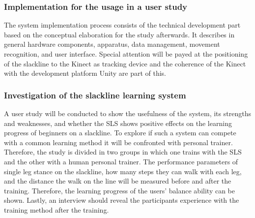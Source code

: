 \subsubsection{Implementation for the usage in a user study}
The system implementation process consists of the technical development part based on the conceptual elaboration for the study afterwards.
It describes in general hardware components, apparatus, data management, movement recognition, and user interface.
Special attention will be payed at the positioning of the slackline to the Kinect as tracking device and the coherence of the Kinect with the development platform Unity are part of this.

\subsubsection{Investigation of the slackline learning system}
A user study will be conducted to show the usefulness of the system, its strengths and weaknesses, and whether the SLS shows positive effects on the learning progress of beginners on a slackline. To explore if such a system can compete with a common learning method it will be confronted with personal trainer.
Therefore, the study is divided in two groups in which one trains with the SLS and the other with a human personal trainer.
The performance parameters of single leg stance on the slackline, how many steps they can walk with each leg, and the distance the walk on the line will be measured before and after the training.
Therefore, the learning progress of the users' balance ability can be shown.
Lastly, an interview should reveal the participants experience with the training method after the training.



